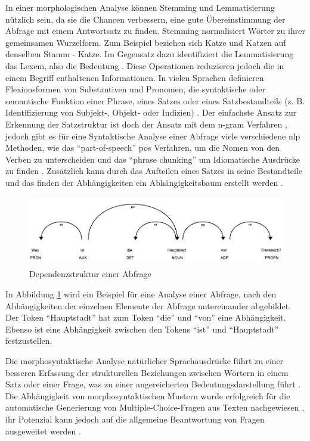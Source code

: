 \documentclass[
        ngerman,
        paper=a4,
        numbers=noendperiod,
]{scrreprt}
\begin{document}
In einer morphologischen Analyse können Stemming und Lemmatisierung nützlich sein, da sie die Chancen verbessern, eine gute Übereinstimmung der Abfrage mit einem Antwortsatz zu finden. Stemming normalisiert Wörter zu ihrer gemeinsamen Wurzelform. Zum Beispiel beziehen sich Katze und Katzen auf denselben Stamm - Katze. Im Gegensatz dazu identifiziert die Lemmatisierung das Lexem, also die Bedeutung \citep[S. 5419]{Kolomiyets2011APerspective}. Diese Operationen reduzieren jedoch die in einem Begriff enthaltenen Informationen. In vielen Sprachen definieren Flexionsformen von Substantiven und Pronomen, die syntaktische oder semantische Funktion einer Phrase, eines Satzes oder eines Satzbestandteils (z. B. Identifizierung von Subjekt-, Objekt- oder Indizien) \citep{nivre2006maltparser}. Der einfachste Ansatz zur Erkennung der Satzstruktur ist doch der Ansatz mit dem n-gram Verfahren \citep{brill2002analysis}, jedoch gibt es für eine Syntaktische Analyse einer Abfrage viele verschiedene \ac{nlp} Methoden, wie das \enquote{part-of-speech} \ac{pos} Verfahren, um die Nomen von den Verben zu unterscheiden und das \enquote{phrase chunking} um Idiomatische Ausdrücke zu finden \citep[S. 5419]{Kolomiyets2011APerspective}. Zusätzlich kann durch das Aufteilen eines Satzes in seine Bestandteile und das finden der Abhängigkeiten ein Abhängigkeitsbaum erstellt werden \citep{cui2005question}.  

\begin{figure}[H]
\centering\includegraphics[width=0.9\linewidth]{images/dep.png}
\caption[Dependenzstruktur einer Frage]{Dependenzstruktur einer Abfrage}
\label{fig:dep}
\end{figure}

In Abbildung \ref{fig:dep} wird ein Beispiel für eine Analyse einer Abfrage, nach den Abhängigkeiten der einzelnen Elemente der Abfrage untereinander abgebildet. Der Token \enquote{Hauptstadt} hat zum Token \enquote{die} und \enquote{von} eine Abhängigkeit. Ebenso ist eine Abhängigkeit zwischen den Tokens \enquote{ist} und \enquote{Hauptstadt} festzustellen.

Die morphosyntaktische Analyse natürlicher Sprachausdrücke führt zu einer besseren Erfassung der strukturellen Beziehungen zwischen
Wörtern in einem Satz oder einer Frage, was zu einer angereicherten Bedeutungsdarstellung führt \citep[S. 5420]{Kolomiyets2011APerspective}. Die Abhängigkeit von morphosyntaktischen Mustern wurde erfolgreich für die automatische Generierung von Multiple-Choice-Fragen aus Texten nachgewiesen \citep{mitkov2006computer}, ihr Potenzial kann jedoch auf die allgemeine Beantwortung von Fragen ausgeweitet werden \citep[S. 5420]{Kolomiyets2011APerspective}.
\end{document}
